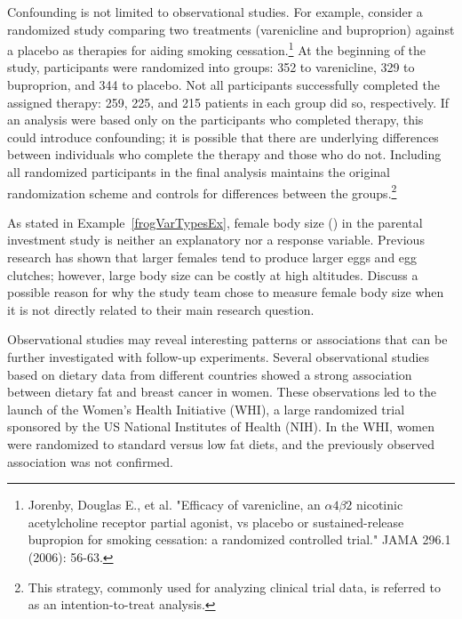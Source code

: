 Confounding is not limited to observational studies. For example, consider a randomized study comparing two treatments (varenicline and buproprion) against a placebo as therapies for aiding smoking cessation.\footnote{Jorenby, Douglas E., et al. "Efficacy of varenicline, an $\alpha4\beta2$ nicotinic acetylcholine receptor partial agonist, vs placebo or sustained-release bupropion for smoking cessation: a randomized controlled trial." JAMA 296.1 (2006): 56-63.} At the beginning of the study, participants were randomized into groups: 352 to varenicline, 329 to buproprion, and 344 to placebo. Not all participants successfully completed the assigned therapy: 259, 225, and 215 patients in each group did so, respectively. If an analysis were based only on the participants who completed therapy, this could introduce confounding; it is possible that there are underlying differences between individuals who complete the therapy and those who do not. Including all randomized participants in the final analysis maintains the original randomization scheme and controls for differences between the groups.\footnote{This strategy, commonly used for analyzing clinical trial data, is referred to as an intention-to-treat analysis.}

\begin{exercisewrap}
\begin{nexercise}
As stated in Example~\ref{frogVarTypesEx}, female body size () in the parental investment study is neither an explanatory nor a response variable. Previous research has shown that larger females tend to produce larger eggs and egg clutches; however, large body size can be costly at high altitudes. Discuss a possible reason for why the study team chose to measure female body size when it is not directly related to their main research question.\footnotemark{}
\end{nexercise}
\end{exercisewrap}

Observational studies may reveal interesting patterns or associations that can be further investigated with follow-up experiments. Several observational studies based on dietary data from different countries showed a strong association between dietary fat and breast cancer in women. These observations led to the launch of the Women's Health Initiative (WHI), a large randomized trial sponsored by the US National Institutes of Health (NIH).  In the WHI, women were randomized to standard versus low fat diets, and the previously observed association was not confirmed.  

